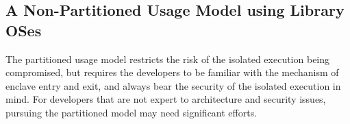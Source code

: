 %



\subsection{A Non-Partitioned Usage Model using Library OSes}
\label{sec:gsgx:background:libos}
 
The partitioned usage model restricts the risk of the isolated execution being compromised,
but requires the developers to be familiar with
the mechanism of enclave entry and exit,
and always bear the security of the isolated execution in mind.
For developers that are not expert to architecture and security issues,
pursuing the partitioned model may need significant efforts.   

